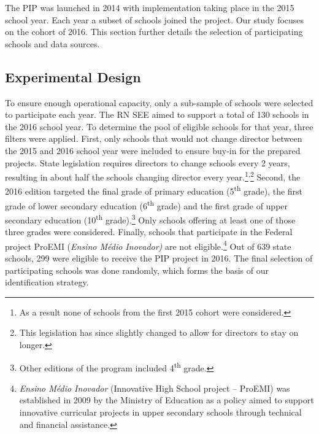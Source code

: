 \documentclass[11pt,a4paper]{article}
\begin{document}
The PIP was launched in 2014 with implementation taking place in the 2015 school year. Each year a subset of schools joined the project. Our study focuses on the cohort of 2016. This section further details the selection of participating schools and data sources.

\subsection{Experimental Design} \label{sec:experiment}

To ensure enough operational capacity, only a sub-sample of schools were selected to participate each year. The RN SEE aimed to support a total of 130 schools in the 2016 school year. To determine the pool of eligible schools for that year, three filters were applied. First, only schools that would not change director between the 2015 and 2016 school year were included to ensure buy-in for the prepared projects. State legislation requires directors to change schools every 2 years, resulting in about half the schools changing director every year.\footnote{As a result none of schools from the first 2015 cohort were considered.}\textsuperscript{,}\footnote{This legislation has since slightly changed to allow for directors to stay on longer.} Second, the 2016 edition targeted the final grade of primary education (5\textsuperscript{th} grade), the first grade of lower secondary education (6\textsuperscript{th} grade) and the first grade of upper secondary education (10\textsuperscript{th} grade).\footnote{Other editions of the program included 4\textsuperscript{th} grade.} Only schools offering at least one of those three grades were considered. Finally, schools that participate in the Federal project ProEMI (\textit{Ensino Médio Inovador)} are not eligible.\footnote{\textit{Ensino Médio Inovador} (Innovative High School project -- ProEMI) was established in 2009 by the Ministry of Education as a policy aimed to support innovative curricular projects in upper secondary schools through technical and financial assistance.} Out of 639 state schools, 299 were eligible to receive the PIP project in 2016. The final selection of participating schools was done randomly, which forms the basis of our identification strategy. 
\end{document}
